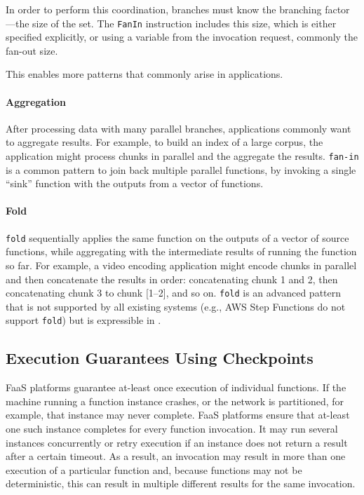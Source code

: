 In order to perform this coordination, branches must know the branching
factor---the size of the set. The \texttt{FanIn} instruction includes this size,
which is either specified explicitly, or using a variable from the invocation
request, commonly the fan-out size.


This enables more patterns that commonly arise in applications.

\paragraph{Aggregation}
After processing data with many parallel branches, applications commonly want to
aggregate results. For example, to build an index of a large corpus, the
application might process chunks in parallel and the aggregate the results.
\texttt{fan-in} is a common pattern to join back multiple parallel functions, by
invoking a single ``sink'' function with the outputs from a vector of functions.

\paragraph{Fold}
\texttt{fold} sequentially applies the same function on the outputs of a vector
of source functions, while aggregating with the intermediate results of running
the function so far. For example, a video encoding application might encode
chunks in parallel and then concatenate the results in order: concatenating
chunk 1 and 2, then concatenating chunk 3 to chunk [1--2], and so on.
\texttt{fold} is an advanced pattern that is not supported by all existing
systems (e.g., AWS Step Functions do not support \texttt{fold}) but is
expressible in \name{}.

\subsection{Execution Guarantees Using Checkpoints}\label{sec:design:execution}

FaaS platforms guarantee at-least once execution of individual functions. If the
machine running a function instance crashes, or the network is partitioned, for
example, that instance may never complete. FaaS platforms ensure that at-least
one such instance completes for every function invocation. It may run several
instances concurrently or retry execution if an instance does not return a
result after a certain timeout. As a result, an invocation may result in more
than one execution of a particular function and, because functions may not be
deterministic, this can result in multiple different results for the same
invocation.

